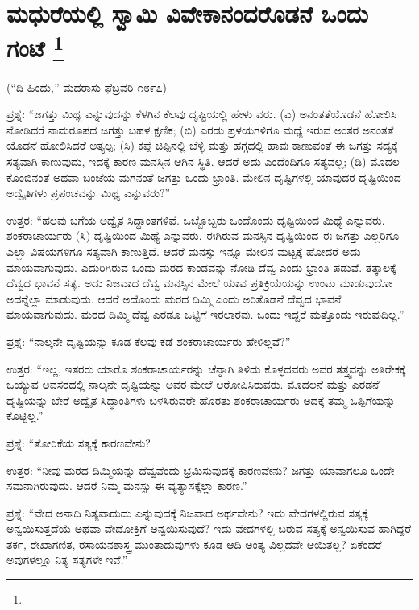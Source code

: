 
\chapter[ಮಧುರೆಯಲ್ಲಿ ಸ್ವಾಮಿ ವಿವೇಕಾನಂದರೊಡನೆ ಒಂದು ಗಂಟೆ ]{ಮಧುರೆಯಲ್ಲಿ ಸ್ವಾಮಿ ವಿವೇಕಾನಂದರೊಡನೆ ಒಂದು ಗಂಟೆ \protect\footnote{}}

\centerline{(“ದಿ ಹಿಂದು,” ಮದರಾಸು-ಫೆಬ್ರವರಿ ೧೮೯೭)}

ಪ್ರಶ್ನೆ: “ಜಗತ್ತು ಮಿಥ್ಯ ಎನ್ನುವುದನ್ನು ಕೆಳಗಿನ ಕೆಲವು ದೃಷ್ಟಿಯಲ್ಲಿ ಹೇಳು ವರು. (ಎ) ಅನಂತತೆಯೊಡನೆ ಹೋಲಿಸಿ ನೋಡಿದರೆ ನಾಮರೂಪದ ಜಗತ್ತು ಬಹಳ ಕ್ಷಣಿಕ; (ಬಿ) ಎರಡು ಪ್ರಳಯಗಳಿಗೂ ಮಧ್ಯೆ ಇರುವ ಅಂತರ ಅನಂತತೆ ಯೊಡನೆ ಹೋಲಿಸಿದರೆ ಅತ್ಯಲ್ಪ; (ಸಿ) ಕಪ್ಪೆ ಚಿಪ್ಪಿನಲ್ಲಿ ಬೆಳ್ಳಿ ಮತ್ತು ಹಗ್ಗದಲ್ಲಿ ಹಾವು ಕಾಣುವಂತೆ ಈ ಜಗತ್ತು ಸದ್ಯಕ್ಕೆ ಸತ್ಯವಾಗಿ ಕಾಣುವುದು, ಇದಕ್ಕೆ ಕಾರಣ ಮನಸ್ಸಿನ ಆಗಿನ ಸ್ಥಿತಿ. ಆದರೆ ಅದು ಎಂದೆಂದಿಗೂ ಸತ್ಯವಲ್ಲ; (ಡಿ) ಮೊದಲ ಕೊಂಬಿನಂತೆ ಅಥವಾ ಬಂಜೆಯ ಮಗನಂತೆ ಜಗತ್ತು ಒಂದು ಭ್ರಾಂತಿ. ಮೇಲಿನ ದೃಷ್ಟಿಗಳಲ್ಲಿ ಯಾವುದರ ದೃಷ್ಟಿಯಿಂದ ಅದ್ವೈತಿಗಳು ಪ್ರಪಂಚವನ್ನು ಮಿಥ್ಯ ಎನ್ನುವರು?”

ಉತ್ತರ: “ಹಲವು ಬಗೆಯ ಅದ್ವೈತ ಸಿದ್ಧಾಂತಗಳಿವೆ. ಒಬ್ಬೊಬ್ಬರು ಒಂದೊಂದು ದೃಷ್ಟಿಯಿಂದ ಮಿಥ್ಯೆ ಎನ್ನುವರು. ಶಂಕರಾಚಾರ್ಯರು (ಸಿ) ದೃಷ್ಟಿಯಿಂದ ಮಿಥ್ಯೆ ಎನ್ನುವರು. ಈಗಿರುವ ಮನಸ್ಸಿನ ದೃಷ್ಟಿಯಿಂದ ಈ ಜಗತ್ತು ಎಲ್ಲರಿಗೂ ಎಲ್ಲಾ ವಿಷಯಗಳಿಗೂ ಸತ್ಯವಾಗಿ ಕಾಣುತ್ತಿದೆ. ಆದರೆ ಮನಸ್ಸು ಇನ್ನೂ ಮೇಲಿನ ಮಟ್ಟಕ್ಕೆ ಹೋದರೆ ಅದು ಮಾಯವಾಗುವುದು. ಎದುರಿಗಿರುವ ಒಂದು ಮರದ ಕಾಂಡವನ್ನು ನೋಡಿ ದೆವ್ವ ಎಂದು ಭ್ರಾಂತಿ ಪಡುವೆ. ತತ್ಕಾಲಕ್ಕೆ ದೆವ್ವದ ಭಾವನೆ ಸತ್ಯ. ಅದು ನಿಜವಾದ ದೆವ್ವ ಮನಸ್ಸಿನ ಮೇಲೆ ಯಾವ ಪ್ರತಿಕ್ರಿಯೆಯನ್ನು ಉಂಟು ಮಾಡುವುದೋ ಅದನ್ನೆಲ್ಲಾ ಮಾಡುವುದು. ಆದರೆ ಅದೊಂದು ಮರದ ದಿಮ್ಮಿ ಎಂದು ಅರಿತೊಡನೆ ದೆವ್ವದ ಭಾವನೆ ಮಾಯವಾಗುವುದು. ಮರದ ದಿಮ್ಮಿ ದೆವ್ವ ಎರಡೂ ಒಟ್ಟಿಗೆ ಇರಲಾರವು. ಒಂದು ಇದ್ದರೆ ಮತ್ತೊಂದು ಇರುವುದಿಲ್ಲ.”

ಪ್ರಶ್ನೆ: “ನಾಲ್ಕನೇ ದೃಷ್ಟಿಯನ್ನು ಕೂಡ ಕೆಲವು ಕಡೆ ಶಂಕರಾಚಾರ್ಯರು ಹೇಳಿಲ್ಲವೆ?”

ಉತ್ತರ: “ಇಲ್ಲ, ಇತರರು ಯಾರೊ ಶಂಕರಾಚಾರ್ಯರನ್ನು ಚೆನ್ನಾಗಿ ತಿಳಿದು ಕೊಳ್ಳದವರು ಅವರ ತತ್ತ್ವವನ್ನು ಅತಿರೇಕಕ್ಕೆ ಒಯ್ಯುವ ಅವಸರದಲ್ಲಿ ನಾಲ್ಕನೇ ದೃಷ್ಟಿಯನ್ನು ಅವರ ಮೇಲೆ ಆರೋಪಿಸಿರುವರು. ಮೊದಲನೆ ಮತ್ತು ಎರಡನೆ ದೃಷ್ಟಿಯನ್ನು ಬೇರೆ ಅದ್ವೈತ ಸಿದ್ಧಾಂತಿಗಳು ಬಳಸಿರುವರೇ ಹೊರತು ಶಂಕರಾಚಾರ್ಯರು ಅದಕ್ಕೆ ತಮ್ಮ ಒಪ್ಪಿಗೆಯನ್ನು ಕೊಟ್ಟಿಲ್ಲ.”

ಪ್ರಶ್ನೆ: “ತೋರಿಕೆಯ ಸತ್ಯಕ್ಕೆ ಕಾರಣವೇನು?

ಉತ್ತರ: “ನೀವು ಮರದ ದಿಮ್ಮಿಯನ್ನು ದೆವ್ವವೆಂದು ಭ್ರಮಿಸುವುದಕ್ಕೆ ಕಾರಣವೇನು? ಜಗತ್ತು ಯಾವಾಗಲೂ ಒಂದೇ ಸಮನಾಗಿರುವುದು. ಆದರೆ ನಿಮ್ಮ ಮನಸ್ಸು ಈ ವ್ಯತ್ಯಾಸಕ್ಕೆಲ್ಲಾ ಕಾರಣ.”

ಪ್ರಶ್ನೆ: “ವೇದ ಅನಾದಿ ನಿತ್ಯವಾದುದು ಎನ್ನುವುದಕ್ಕೆ ನಿಜವಾದ ಅರ್ಥವೇನು? ಇದು ವೇದಗಳಲ್ಲಿರುವ ಸತ್ಯಕ್ಕೆ ಅನ್ವಯಿಸುತ್ತದೆಯೆ ಅಥವಾ ವೇದೋಕ್ತಿಗೆ ಅನ್ವಯಿಸುವುದೆ? ಇದು ವೇದಗಳಲ್ಲಿ ಬರುವ ಸತ್ಯಕ್ಕೆ ಅನ್ವಯಿಸುವ ಹಾಗಿದ್ದರೆ ತರ್ಕ, ರೇಖಾಗಣಿತ, ರಸಾಯನಶಾಸ್ತ್ರ ಮುಂತಾದುವುಗಳು ಕೂಡ ಆದಿ ಅಂತ್ಯ ವಿಲ್ಲದವೇ ಆಯಿತಲ್ಲ? ಏಕೆಂದರೆ ಅವುಗಳಲ್ಲೂ ನಿತ್ಯ ಸತ್ಯಗಳೇ ಇವೆ.”

